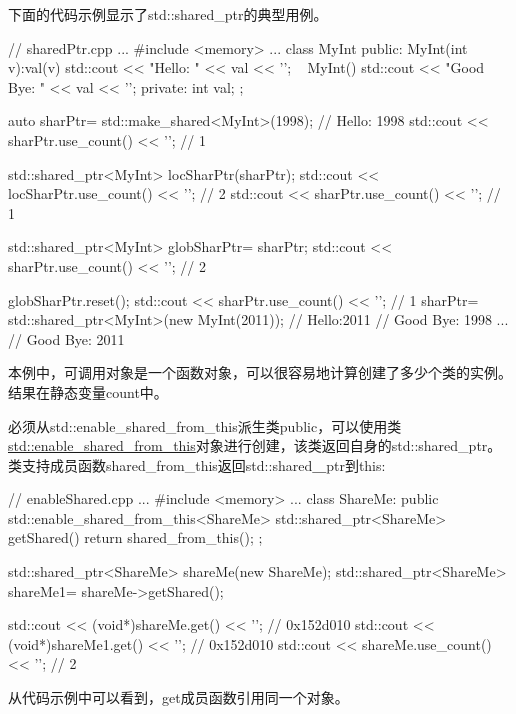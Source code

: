 下面的代码示例显示了std::shared\_ptr的典型用例。


\begin{cpp}
// sharedPtr.cpp
...
#include <memory>
...
class MyInt{
public:
	MyInt(int v):val(v){
		std::cout << "Hello: " << val << '\n';
	} ~
	MyInt(){
		std::cout << "Good Bye: " << val << '\n';
	}
private:
	int val;
};

auto sharPtr= std::make_shared<MyInt>(1998); // Hello: 1998
std::cout << sharPtr.use_count() << '\n'; // 1

{
	std::shared_ptr<MyInt> locSharPtr(sharPtr);
	std::cout << locSharPtr.use_count() << '\n'; // 2
}
std::cout << sharPtr.use_count() << '\n'; // 1

std::shared_ptr<MyInt> globSharPtr= sharPtr;
std::cout << sharPtr.use_count() << '\n'; // 2

globSharPtr.reset();
std::cout << sharPtr.use_count() << '\n'; // 1
sharPtr= std::shared_ptr<MyInt>(new MyInt(2011)); // Hello:2011
												  // Good Bye: 1998
...
// Good Bye: 2011
\end{cpp}

本例中，可调用对象是一个函数对象，可以很容易地计算创建了多少个类的实例。结果在静态变量count中。


必须从std::enable\_shared\_from\_this派生类public，可以使用类\href{http://en.cppreference.com/w/cpp/memory/enable_shared_from_this}{std::enable\_shared\_from\_this}对象进行创建，该类返回自身的std::shared\_ptr。类支持成员函数shared\_from\_this返回std::shared＿ptr到this:


\begin{cpp}
// enableShared.cpp
...
#include <memory>
...
class ShareMe: public std::enable_shared_from_this<ShareMe>{
	std::shared_ptr<ShareMe> getShared(){
		return shared_from_this();
	}
};

std::shared_ptr<ShareMe> shareMe(new ShareMe);
std::shared_ptr<ShareMe> shareMe1= shareMe->getShared();

std::cout << (void*)shareMe.get() << '\n'; // 0x152d010
std::cout << (void*)shareMe1.get() << '\n'; // 0x152d010
std::cout << shareMe.use_count() << '\n'; // 2
\end{cpp}

从代码示例中可以看到，get成员函数引用同一个对象。


